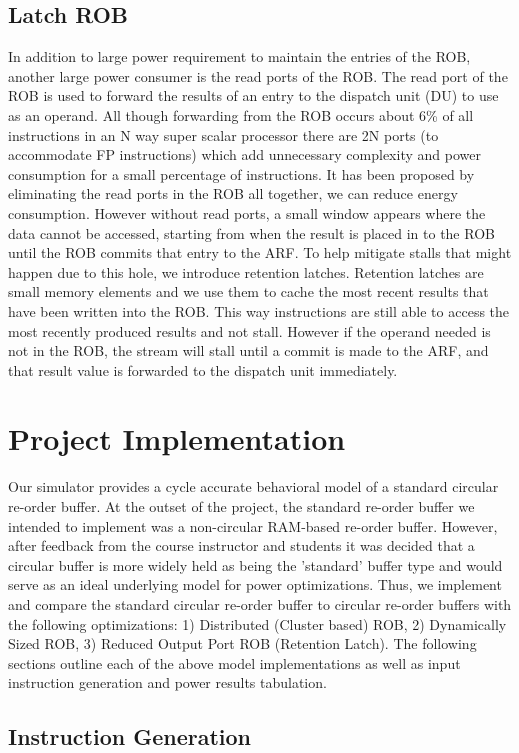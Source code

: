 \documentclass{acm_proc_article-sp}
\begin{document}
\subsection{Latch ROB}
In addition to large power requirement to maintain the entries of the ROB, another 
large power consumer is the read ports of the ROB.  The read port of the ROB is used
to forward the results of an entry to the dispatch unit (DU) to use as an operand.
All though forwarding from the ROB occurs about 6\%\cite{kucuk} of all instructions 
in an N way super scalar processor there are 2N ports (to accommodate FP
 instructions) which add unnecessary complexity and power consumption for a small 
percentage of instructions.  It has been proposed by eliminating the read ports 
in the ROB all together, we can reduce energy consumption\cite{kucuk}.  However
without read ports, a small window appears where the data cannot be accessed,
starting from when the result is placed in to the ROB until the ROB commits that 
entry to the ARF.  To help mitigate stalls that might happen due to this hole, 
we introduce retention latches.   Retention latches are small memory elements and 
we use them to cache the most recent results that have been written into the ROB.
This way instructions are still able to access the most recently produced results
and not stall.  However if the operand needed is not in the ROB, the stream will 
stall until a commit is made to the ARF, and that result value is forwarded to 
the dispatch unit immediately.

\section{Project Implementation}
Our simulator provides a cycle accurate behavioral model of a standard circular re-order buffer.  At the outset of the project, the standard re-order buffer we intended to implement was a non-circular RAM-based re-order buffer.  However, after feedback from the course instructor and students it was decided that a circular buffer is more widely held as being the 'standard' buffer type and would serve as an ideal underlying model for power optimizations.  Thus, we implement and compare the standard circular re-order buffer to circular re-order buffers with the following optimizations: 1) Distributed (Cluster based) ROB, 2) Dynamically Sized ROB, 3) Reduced Output Port ROB (Retention Latch). The following sections outline each of the above model implementations as well as input instruction generation and power results tabulation.
\subsection{Instruction Generation}
\end{document}
